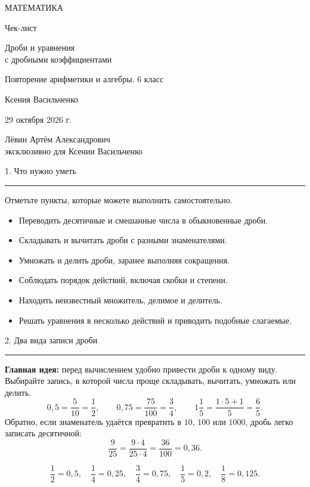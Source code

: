 \documentclass[a4paper,12pt]{article}
\newcommand{\sect}[1]{%
  \vspace{5pt}%
  {\Large\color{darkaccent}#1\par}%
  \vspace{2pt}%
  {\color{accent}\rule{\linewidth}{0.55pt}\par}%
  \vspace{5pt}%
}
\newcommand{\minititle}[1]{\par\Needspace{5\baselineskip}\vspace{2pt}{\color{darkaccent}\bfseries #1}\par\vspace{2pt}}
\newcommand{\checkitem}[1]{\item[$\square$] #1}
\newcommand{\important}[1]{{\color{darkaccent}\bfseries #1}}
\begin{document}

\thispagestyle{empty}
\begin{center}
\vspace*{27mm}
{\Large\color{darkaccent} МАТЕМАТИКА\par}
\vspace{17mm}
{\LARGE\color{textgray} Чек-лист\par}
\vspace{10mm}
{\LARGE\color{accent} Дроби и уравнения\\[3pt] с дробными коэффициентами\par}
\vspace{16mm}
{\normalsize Повторение арифметики и алгебры. 6 класс\par}
\vfill
{\large Ксения Васильченко\par}
\vspace{11mm}
{29 октября 2026 г.\par}
\vspace{18mm}
{\small Лёвин Артём Александрович\\[5pt] эксклюзивно для Ксении Васильченко\par}
\vspace{21mm}
\vspace{8mm}
\end{center}
\clearpage

\sect{1. Что нужно уметь}
Отметьте пункты, которые можете выполнить самостоятельно.
\begin{itemize}[itemsep=4pt]
\checkitem{Переводить десятичные и смешанные числа в обыкновенные дроби.}
\checkitem{Складывать и вычитать дроби с разными знаменателями.}
\checkitem{Умножать и делить дроби, заранее выполняя сокращения.}
\checkitem{Соблюдать порядок действий, включая скобки и степени.}
\checkitem{Находить неизвестный множитель, делимое и делитель.}
\checkitem{Решать уравнения в несколько действий и приводить подобные слагаемые.}
\end{itemize}

\sect{2. Два вида записи дроби}
\important{Главная идея:} перед вычислением удобно привести дроби к одному виду. Выбирайте запись, в которой числа проще складывать, вычитать, умножать или делить.
\[
0,5=\frac{5}{10}=\frac12,\qquad
0,75=\frac{75}{100}=\frac34,\qquad
1\frac15=\frac{1\cdot5+1}{5}=\frac65.
\]
Обратно, если знаменатель удаётся превратить в $10$, $100$ или $1000$, дробь легко записать десятичной:
\[
\frac9{25}=\frac{9\cdot4}{25\cdot4}=\frac{36}{100}=0,36.
\]
\minititle{Полезные равенства}
\[
\frac12=0,5,\quad \frac14=0,25,\quad \frac34=0,75,\quad
\frac15=0,2,\quad \frac18=0,125.
\]
\end{document}
